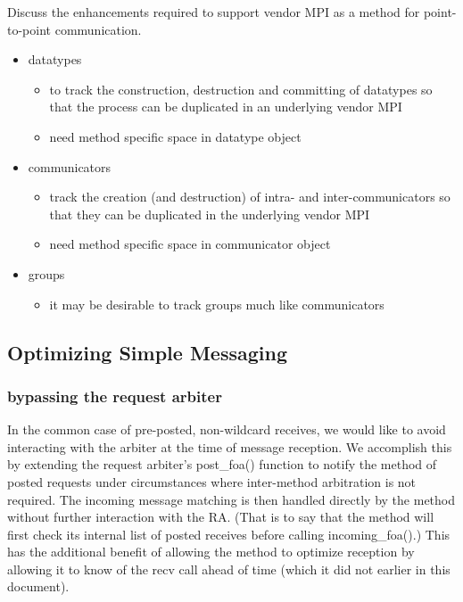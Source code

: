 Discuss the enhancements required to support vendor MPI as a method for
point-to-point communication.
\begin{itemize}
\item datatypes
  \begin{itemize}
  \item to track the construction, destruction and committing of datatypes so
    that the process can be duplicated in an underlying vendor MPI
  \item need method specific space in datatype object 
  \end{itemize}
\item communicators
  \begin{itemize}
  \item track the creation (and destruction) of intra- and inter-communicators
    so that they can be duplicated in the underlying vendor MPI
  \item need method specific space in communicator object 
  \end{itemize}
\item groups
  \begin{itemize}
  \item it may be desirable to track groups much like communicators
  \end{itemize}
\end{itemize}


\subsection{Optimizing Simple Messaging}


\subsubsection{bypassing the request arbiter}

In the common case of pre-posted, non-wildcard receives, we would like to avoid
interacting with the arbiter at the time of message reception.  We accomplish
this by extending the request arbiter's post_foa() function to notify the
method of posted requests under circumstances where inter-method arbitration is
not required.  The incoming message matching is then handled directly by the
method without further interaction with the RA.  (That is to say that the
method will first check its internal list of posted receives before calling
incoming_foa().)  This has the additional benefit of allowing the method to
optimize reception by allowing it to know of the recv call ahead of time (which
it did not earlier in this document).

